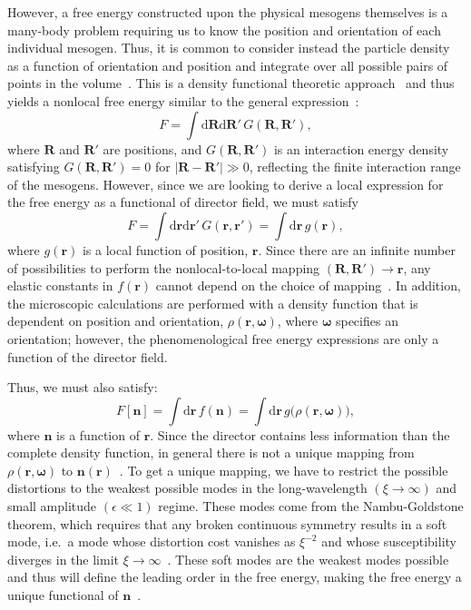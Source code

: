 However, a free energy constructed upon the physical mesogens themselves is a many-body problem requiring us to know the position and orientation of each individual mesogen.
Thus, it is common to consider instead the particle density as a function of orientation and position and integrate over all possible pairs of points in the volume~\cite{RN222}.
This is a density functional theoretic approach~\cite{RN223} and thus yields a nonlocal free energy similar to the general expression~\cite{RN56,RN55}:
\begin{equation}
  F = \int \textrm{d}\mathbf{R} \textrm{d}\mathbf{R}' \, G(\mathbf{R},\mathbf{R}'),
\end{equation}
where $\mathbf{R}$ and $\mathbf{R}'$ are positions, and $G(\mathbf{R},\mathbf{R}')$ is an interaction energy density satisfying $G(\mathbf{R},\mathbf{R}') = 0$ for $|\mathbf{R}-\mathbf{R}'| \gg 0$, reflecting the finite interaction range of the mesogens.
However, since we are looking to derive a local expression for the free energy as a functional of director field, we must satisfy
\begin{equation}
  F = \int \textrm{d}\mathbf{r} \textrm{d}\mathbf{r}' \, G(\mathbf{r},\mathbf{r}')
  = \int \textrm{d} \mathbf{r} \, g(\mathbf{r}),\label{e:2-NonlocalLocal}
\end{equation}
where $g(\mathbf{r})$ is a local function of position, $\mathbf{r}$.
Since there are an infinite number of possibilities to perform the nonlocal-to-local mapping $(\mathbf{R},\mathbf{R}') \rightarrow \mathbf{r}$, any elastic constants in $f(\mathbf{r})$ cannot depend on the choice of mapping~\cite{RN55}.
In addition, the microscopic calculations are performed with a density function that is dependent on position and orientation, $\rho(\mathbf{r},\mathbf{\omega})$, where $\mathbf{\omega}$ specifies an orientation; however, the phenomenological free energy expressions are only a function of the director field.

Thus, we must also satisfy:
\begin{equation}
  F[\mathbf{n}] = \int \textrm{d} \mathbf{r} \, f(\mathbf{n}) = \int \textrm{d} \mathbf{r} \, g \big ( \rho(\mathbf{r},\mathbf{\omega}) \big),\label{e:2-LessInfo}
\end{equation}
where $\mathbf{n}$ is a function of $\mathbf{r}$.
Since the director contains less information than the complete density function, in general there is not a unique mapping from  $\rho(\mathbf{r},\mathbf{\omega})$ to $\mathbf{n}(\mathbf{r})$~\cite{RN55}.
To get a unique mapping, we have to restrict the possible distortions to the weakest possible modes in the long-wavelength $(\xi \rightarrow \infty)$ and small amplitude $(\epsilon \ll 1)$ regime.
These modes come from the Nambu-Goldstone theorem, which requires that any broken continuous symmetry results in a soft mode, i.e.\ a mode whose distortion cost vanishes as $\xi^{-2}$ and whose susceptibility diverges in the limit $\xi \rightarrow \infty$~\cite{RN175,RN226,RN227,RN228}.
These soft modes are the weakest modes possible and thus will define the leading order in the free energy, making the free energy a unique functional of $\mathbf{n}$~\cite{RN55}. \\

